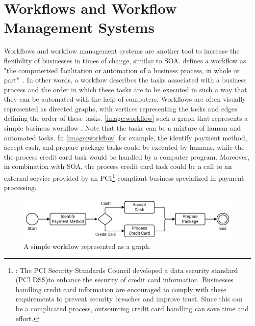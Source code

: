 \section{Workflows and Workflow Management Systems}

Workflows and workflow management systems are another tool to increase the flexibility of businesses in times of change, similar to SOA.
\citeauthor*{workflow:referencemodel} defines a workflow as "the computerised facilitation or automation of a business process, in whole or part"~\autocite{workflow:referencemodel}.
In other words, a workflow describes the tasks associated with a business process and the order in which these tasks are to be executed in such a way that they can be automated with the help of computers.
Workflows are often visually represented as directed graphs, with vertices representing the tasks and edges defining the order of these tasks.
\autoref{image:workflow} such a graph that represents a simple business workflow .
Note that the tasks can be a mixture of human and automated tasks.
In \autoref{image:workflow} for example, the identify payment method, accept cash, and prepare package tasks could be executed by humans, while the the process credit card task would be handled by a computer program.
Moreover, in combination with SOA, the process credit card task could be a call to an external service provided by an PCI\footnote{: The PCI Security Standards Council developed a data security standard (PCI DSS)\footnotemark to enhance the security of credit card information. Businesses handling credit card information are encouraged to comply with these requirements to prevent security breaches and improve trust. Since this can be a complicated process, outsourcing credit card handling can save time and effort.} compliant business specialized in payment processing.


\begin{figure}[!htbp]
	\centering
	\includegraphics[resolution=600]{fundamentals/assets/workflow}
	\caption{A simple workflow represented as a graph.}
	\label{image:workflow}
\end{figure}

